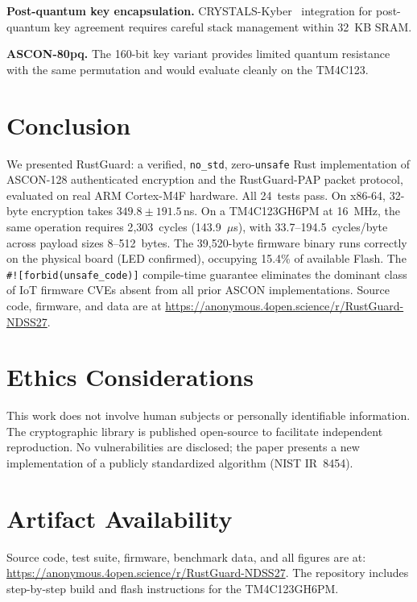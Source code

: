 \documentclass[anonymous]{ndss}
\newcommand{\code}[1]{\mbox{\texttt{#1}}}
\newcommand{\nstd}{\texttt{no\_std}}
\newcommand{\forbid}{\code{\#![forbid(unsafe\_code)]}}
\begin{document}
\textbf{Post-quantum key encapsulation.} CRYSTALS-Kyber~\cite{b20}
integration for post-quantum key agreement requires careful stack management
within 32~KB SRAM.

\textbf{ASCON-80pq.} The 160-bit key variant provides limited quantum
resistance with the same permutation and would evaluate cleanly on the
TM4C123.

\section{Conclusion}
\label{sec:conclusion}

We presented RustGuard: a verified, \nstd{}, zero-\texttt{unsafe} Rust
implementation of ASCON-128 authenticated encryption and the RustGuard-PAP
packet protocol, evaluated on real ARM Cortex-M4F hardware. All 24~tests pass.
On x86-64, 32-byte encryption takes $349.8\pm191.5$\,ns. On a TM4C123GH6PM
at 16~MHz, the same operation requires 2{,}303~cycles (143.9~$\mu$s), with
33.7--194.5~cycles/byte across payload sizes 8--512~bytes. The 39{,}520-byte
firmware binary runs correctly on the physical board (LED confirmed),
occupying 15.4\% of available Flash. The \forbid{} compile-time guarantee
eliminates the dominant class of IoT firmware CVEs absent from all prior
ASCON implementations. Source code, firmware, and data are at
\url{https://anonymous.4open.science/r/RustGuard-NDSS27}.

\section*{Ethics Considerations}

This work does not involve human subjects or personally identifiable
information. The cryptographic library is published open-source to facilitate
independent reproduction. No vulnerabilities are disclosed; the paper presents
a new implementation of a publicly standardized algorithm (NIST IR~8454).

\section*{Artifact Availability}

Source code, test suite, firmware, benchmark data, and all figures are at:
\url{https://anonymous.4open.science/r/RustGuard-NDSS27}.
The repository includes step-by-step build and flash instructions for the
TM4C123GH6PM.
\end{document}
